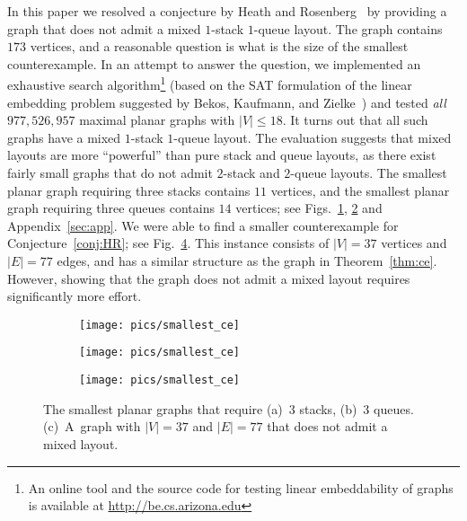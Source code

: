 \documentclass[orivec]{llncs}
\begin{document}
In this paper we resolved a conjecture by Heath and Rosenberg~\cite{HR92} by providing a graph
that does not admit a mixed $1$-stack $1$-queue layout. The graph contains $173$ vertices, and
a reasonable question is what is the size of the smallest counterexample. In an attempt to answer
the question, we implemented an exhaustive search 
algorithm\footnote{An online tool and the source code for testing linear embeddability of graphs is available at \url{http://be.cs.arizona.edu}}
(based on the SAT formulation of
the linear embedding problem suggested by Bekos, Kaufmann, and Zielke~\cite{BKZ15}) and
tested {\it all} $977,526,957$ maximal planar graphs with $|V| \le 18$. It turns out that
all such graphs have a mixed $1$-stack $1$-queue layout. The evaluation suggests that mixed
layouts are more ``powerful'' than pure stack and queue layouts, as there exist fairly small
graphs that do not admit $2$-stack and $2$-queue layouts.
The smallest planar graph requiring three stacks contains $11$ vertices, and the smallest planar graph
requiring three queues contains $14$ vertices; 
see Figs.~\ref{fig:stack3}, \ref{fig:queue3} and Appendix~\ref{sec:app}.
We were able to find a smaller counterexample for Conjecture~\ref{conj:HR}; see Fig.~\ref{fig:mixed3}. This instance consists
of $|V|=37$ vertices and $|E|=77$ edges, and has a similar structure as the graph in Theorem~\ref{thm:ce}.
However, showing that the graph does not admit a mixed layout requires significantly more effort.

\begin{figure}[t]
    \centering
    \begin{subfigure}[b]{.23\linewidth}
        \texttt{[image: pics/smallest\_ce]}
        \caption{}
        \label{fig:stack3}
    \end{subfigure}
    \hfill
    \begin{subfigure}[b]{.32\linewidth}
        \texttt{[image: pics/smallest\_ce]}
        \caption{}
        \label{fig:queue3}
    \end{subfigure}
    \hfill
    \begin{subfigure}[b]{.34\linewidth}
        \texttt{[image: pics/smallest\_ce]}
        \caption{}
        \label{fig:mixed3}
    \end{subfigure}
    \caption{The smallest planar graphs that require (a)~3 stacks, (b)~3 queues. 
        (c)~A~graph with $|V|=37$ and $|E|=77$ that does not admit a mixed layout.}
\end{figure}
\end{document}
